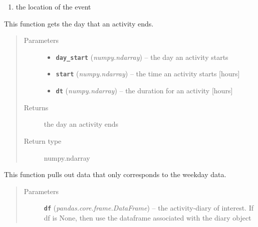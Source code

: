 \documentclass[letterpaper,10pt,english]{sphinxmanual}
\begin{document}
\begin{fulllineitems}
\begin{fulllineitems}
\begin{enumerate}
\item {} 
the location of the event

\end{enumerate}

\end{fulllineitems}


\begin{fulllineitems}
\label{diary:diary.Diary.get_day_end}
This function gets the day that an activity ends.
\begin{quote}\begin{description}
\item[{Parameters}] \leavevmode\begin{itemize}
\item {} 
\textbf{\texttt{day\_start}} (\emph{numpy.ndarray}) -- the day an activity starts

\item {} 
\textbf{\texttt{start}} (\emph{numpy.ndarray}) -- the time an activity starts {[}hours{]}

\item {} 
\textbf{\texttt{dt}} (\emph{numpy.ndarray}) -- the duration for an activity {[}hours{]}

\end{itemize}

\item[{Returns}] \leavevmode
the day an activity ends

\item[{Return type}] \leavevmode
numpy.ndarray

\end{description}\end{quote}

\end{fulllineitems}


\begin{fulllineitems}
\label{diary:diary.Diary.get_weekday_data}
This function pulls out data that only corresponds to the weekday data.
\begin{quote}\begin{description}
\item[{Parameters}] \leavevmode
\textbf{\texttt{df}} (\emph{pandas.core.frame.DataFrame}) -- the activity-diary of interest. If df is None, then use the dataframe         associated with the diary object


\end{description}
\end{quote}
\end{fulllineitems}
\end{fulllineitems}
\end{document}
